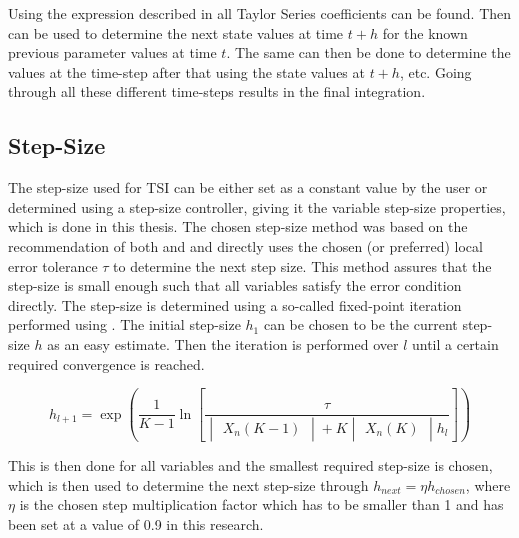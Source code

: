 \noindent
Using the expression described in  all Taylor Series coefficients can be found. Then  can be used to determine the next state values at time $t+h$ for the known previous parameter values at time $t$. The same can then be done to determine the values at the time-step after that using the state values at $t+h$, etc. Going through all these different time-steps results in the final integration. 

\subsection{Step-Size}
\label{subsec:stepSizeTsi}
The step-size used for \ac{TSI} can be either set as a constant value by the user or determined using a step-size controller, giving it the variable step-size properties, which is done in this thesis. The chosen step-size method was based on the recommendation of both \cite{scott2008high} and \cite{bergsma2015application} and directly uses the chosen (or preferred) local error tolerance $\tau$ to determine the next step size. This method assures that the step-size is small enough such that all variables satisfy the error condition directly. The step-size is determined using a so-called fixed-point iteration performed using . The initial step-size $h_{1}$ can be chosen to be the current step-size $h$ as an easy estimate. Then the iteration is performed over $l$ until a certain required convergence is reached.



\begin{equation} \label{eq:fix_point_it}
h_{l+1}=\exp\left(\dfrac{1}{K-1}\ln\left[\dfrac{\tau}{\begin{vmatrix}
X_{n}\left(K-1\right)
\end{vmatrix}+K\begin{vmatrix}
X_{n}\left(K\right)
\end{vmatrix}h_{l}}\right]\right)
\end{equation}

\noindent
This is then done for all variables and the smallest required step-size is chosen, which is then used to determine the next step-size through $h_{next}=\eta h_{chosen}$, where $\eta$ is the chosen step multiplication factor which has to be smaller than 1 and has been set at a value of 0.9 in this research. 


